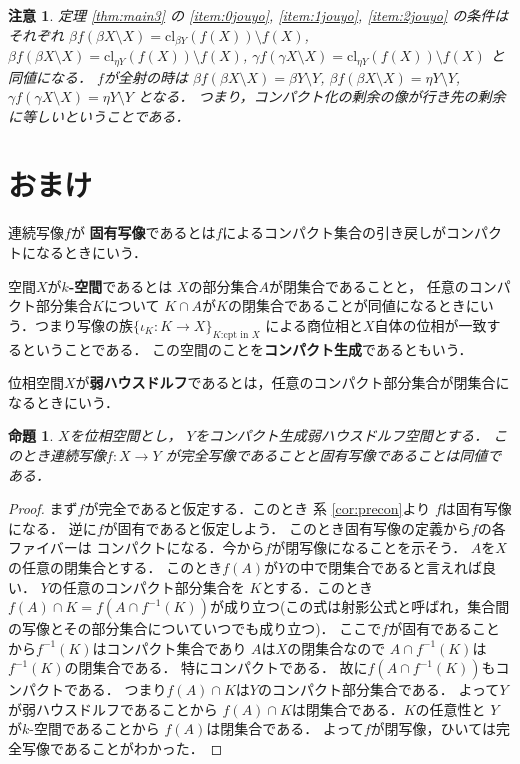 \documentclass[leqno, a4paper, 12pt, dvipdfmx]{jsarticle}
\newtheorem{prop}[thm]{命題}
\newtheorem*{rmk}{注意}
\newcommand{\cl}{\mathrm{cl}}
\begin{document}
\begin{rmk}
定理 \ref{thm:main3}
の
\ref{item:0jouyo},  \ref{item:1jouyo}, \ref{item:2jouyo}
の条件はそれぞれ
$\beta f(\beta X\setminus X)=\cl_{\beta Y}(f(X))\setminus f(X)$,
$\beta f(\beta X\setminus X)=\cl_{\eta Y}(f(X))\setminus f(X)$,
$\gamma f(\gamma X \setminus X)=\cl_{\eta Y}(f(X))\setminus f(X)$
と同値になる．
$f$が全射の時は
$\beta f(\beta X\setminus X)=\beta Y\setminus Y$,
$\beta f(\beta X\setminus X)=\eta Y\setminus Y$,
$\gamma f(\gamma X \setminus X)=\eta Y\setminus Y$
となる．
つまり，コンパクト化の剰余の像が行き先の剰余に等しいということである．
\end{rmk}



\section{おまけ}

連続写像$f$が
\textbf{固有写像}であるとは$f$によるコンパクト集合の引き戻しがコンパクトになるときにいう．

空間$X$が\textbf{$k$-空間}であるとは
$X$の部分集合$A$が閉集合であることと，
任意のコンパクト部分集合$K$について
$K\cap A$が$K$の閉集合であることが同値になるときにいう．つまり写像の族$\{\iota_{K}\colon K\to X\}_{\text{$K$:cpt in $X$}}$
による商位相と$X$自体の位相が一致するということである．
この空間のことを\textbf{コンパクト生成}であるともいう．

位相空間$X$が\textbf{弱ハウスドルフ}であるとは，任意のコンパクト部分集合が閉集合になるときにいう．
\begin{prop}\label{prop:koyuperfect}
$X$を位相空間とし，
$Y$をコンパクト生成弱ハウスドルフ空間とする．
このとき連続写像$f\colon X\to Y$
が完全写像であることと固有写像であることは同値である．
\end{prop}
\begin{proof}
まず$f$が完全であると仮定する．このとき
系
\ref{cor:precon}より
$f$は固有写像になる．
逆に$f$が固有であると仮定しよう．
このとき固有写像の定義から$f$の各ファイバーは
コンパクトになる．今から$f$が閉写像になることを示そう．
$A$を$X$の任意の閉集合とする．
このとき$f(A)$が$Y$の中で閉集合であると言えれば良い．
$Y$の任意のコンパクト部分集合を
$K$とする．このとき
$f(A)\cap K=f(A\cap f^{-1}(K))$が成り立つ(この式は射影公式と呼ばれ，集合間の写像とその部分集合についていつでも成り立つ)．
ここで$f$が固有であることから$f^{-1}(K)$はコンパクト集合であり
$A$は$X$の閉集合なので
$A\cap f^{-1}(K)$は$f^{-1}(K)$の閉集合である．
特にコンパクトである．
故に$f(A\cap f^{-1}(K))$もコンパクトである．
つまり$f(A)\cap K$は$Y$のコンパクト部分集合である．
よって$Y$が弱ハウスドルフであることから
$f(A)\cap K$は閉集合である．$K$の任意性と
$Y$が$k$-空間であることから
$f(A)$は閉集合である．
よって$f$が閉写像，ひいては完全写像であることがわかった．
\end{proof}
\end{document}
